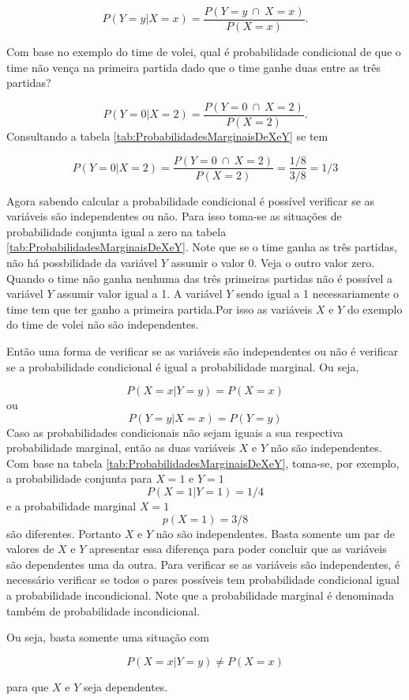\documentclass[
]{book}
\begin{document}
\[
  P(Y=y|X=x) = \dfrac{P (Y=y~\cap~X=x)}{P(X=x)}.
\]

Com base no exemplo do time de volei, qual é probabilidade condicional de que o time não vença na primeira partida dado que o time ganhe duas entre as três partidas?

\[
  P(Y=0|X=2) = \dfrac{P (Y=0~\cap~X=2)}{P(X=2)}.
\]
Consultando a tabela \ref{tab:ProbabilidadesMarginaisDeXeY} se tem

\[
  P(Y=0|X=2) = \dfrac{P (Y=0~\cap~X=2)}{P(X=2)} = \dfrac{1/8}{3/8} = 1/3
\]

Agora sabendo calcular a probabilidade condicional é possível verificar se as variáveis são independentes ou não. Para isso toma-se as situações de probabilidade conjunta igual a zero na tabela \ref{tab:ProbabilidadesMarginaisDeXeY}. Note que se o time ganha as três partidas, não há possbilidade da variável \(Y\) assumir o valor 0. Veja o outro valor zero. Quando o time não ganha nenhuma das três primeiras partidas não é possível a variável \(Y\) assumir valor igual a 1. A variável \(Y\) sendo igual a 1 necessariamente o time tem que ter ganho a primeira partida.Por isso as variáveis \(X\) e \(Y\) do exemplo do time de volei não são independentes.

Então uma forma de verificar se as variáveis são independentes ou não é verificar se a probabilidade condicional é igual a probabilidade marginal. Ou seja,

\[
P(X=x|Y=y) = P(X=x)
\]
ou
\[
P(Y=y|X=x) = P(Y=y)
\]
Caso as probabilidades condicionais não sejam iguais a sua respectiva probabilidade marginal, então as duas variáveis \(X\) e \(Y\) não são independentes. Com base na tabela \ref{tab:ProbabilidadesMarginaisDeXeY}, toma-se, por exemplo,
a probabilidade conjunta para \(X=1\) e \(Y=1\)
\[
  P(X=1|Y=1) =1/4
\]
e a probabilidade marginal \(X=1\)
\[
  p(X=1) = 3/8
\]
são diferentes. Portanto \(X\) e \(Y\) não são independentes. Basta somente um par de valores de \(X\) e \(Y\) apresentar essa diferença para poder concluir que as variáveis são dependentes uma da outra. Para verificar se as variáveis são independentes, é necessário verificar se todos o pares possíveis tem probabilidade condicional igual a probabilidade incondicional. Note que a probabilidade marginal é denominada também de probabilidade incondicional.

Ou seja, basta somente uma situação com

\[
  P(X=x | Y=y) \neq P(X=x)
\]

para que \(X\) e \(Y\) seja dependentes.
\end{document}
